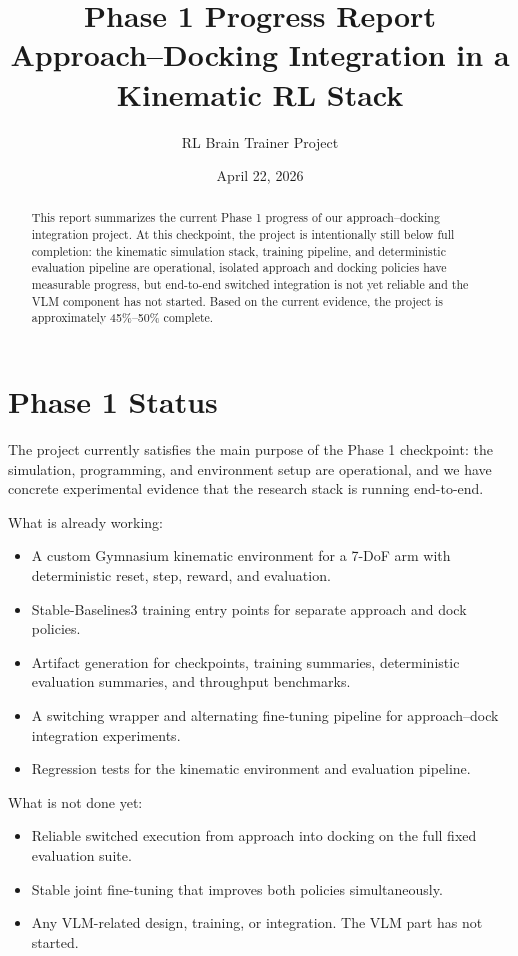 \documentclass[11pt]{article}
\title{Phase 1 Progress Report\\Approach--Docking Integration in a Kinematic RL Stack}
\author{RL Brain Trainer Project}
\date{April 22, 2026}
\begin{document}
\maketitle

\begin{abstract}
This report summarizes the current Phase 1 progress of our approach--docking integration project. At this checkpoint, the project is intentionally still below full completion: the kinematic simulation stack, training pipeline, and deterministic evaluation pipeline are operational, isolated approach and docking policies have measurable progress, but end-to-end switched integration is not yet reliable and the VLM component has not started. Based on the current evidence, the project is approximately 45\%--50\% complete.
\end{abstract}

\section{Phase 1 Status}

The project currently satisfies the main purpose of the Phase 1 checkpoint: the simulation, programming, and environment setup are operational, and we have concrete experimental evidence that the research stack is running end-to-end.

What is already working:
\begin{itemize}[leftmargin=1.5em]
  \item A custom Gymnasium kinematic environment for a 7-DoF arm with deterministic reset, step, reward, and evaluation.
  \item Stable-Baselines3 training entry points for separate approach and dock policies.
  \item Artifact generation for checkpoints, training summaries, deterministic evaluation summaries, and throughput benchmarks.
  \item A switching wrapper and alternating fine-tuning pipeline for approach--dock integration experiments.
  \item Regression tests for the kinematic environment and evaluation pipeline.
\end{itemize}

What is not done yet:
\begin{itemize}[leftmargin=1.5em]
  \item Reliable switched execution from approach into docking on the full fixed evaluation suite.
  \item Stable joint fine-tuning that improves both policies simultaneously.
  \item Any VLM-related design, training, or integration. The VLM part has not started.
\end{itemize}
\end{document}
